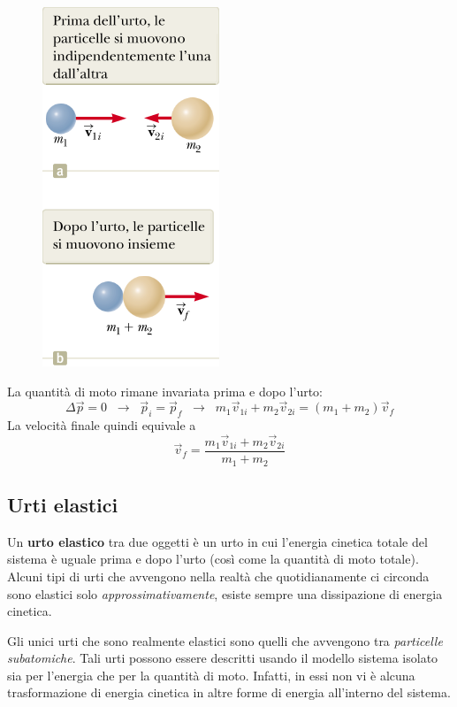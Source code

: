 \documentclass[a4paper,11pt,oneside]{book}
\begin{document}
\begin{figure}[h]
    \includegraphics[scale=0.4]{urto_perfettamente_anelastico.png}
    \centering
\end{figure}
\noindent La quantità di moto rimane invariata prima e dopo l'urto:
\begin{equation*}
    \Delta \vec{p} = 0 \;\; \rightarrow \;\; \vec{p}_i = \vec{p}_f \;\; \rightarrow \;\; m_1\vec{v}_{1i} + m_2\vec{v}_{2i} = (m_1 + m_2) \vec{v}_f
\end{equation*}
La velocità finale quindi equivale a
\begin{equation*}
    \vec{v}_f = \frac{m_1\vec{v}_{1i} + m_2\vec{v}_{2i}}{m_1 + m_2}
\end{equation*}

\subsection{Urti elastici}
Un \textbf{urto elastico} tra due oggetti è un urto in cui l’energia cinetica totale del sistema è uguale prima e dopo l’urto (così come la quantità di moto totale).
Alcuni tipi di urti che avvengono nella realtà che quotidianamente ci circonda sono elastici solo \emph{approssimativamente}, esiste sempre una dissipazione di energia cinetica.

Gli unici urti che sono realmente elastici sono quelli che avvengono tra \emph{particelle subatomiche}. Tali urti possono essere descritti usando il modello sistema isolato sia per l’energia che per la quantità di moto. Infatti, in essi non vi è alcuna trasformazione di energia cinetica in altre forme di energia all’interno del sistema.
\end{document}

